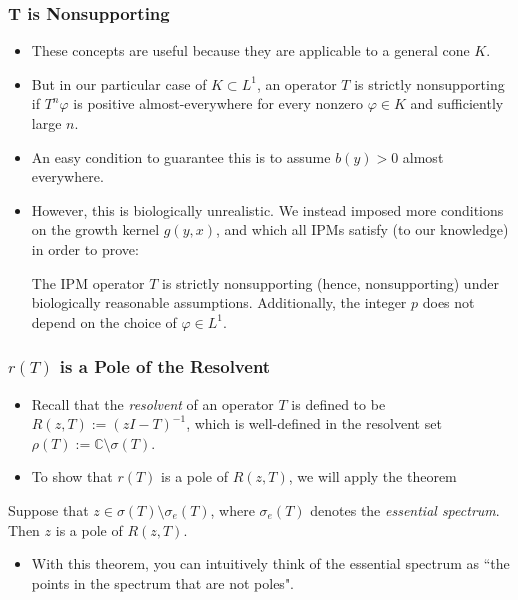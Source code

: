 \documentclass{beamer}
\newcommand{\C}{\mathbb{C}}
\begin{document}
\begin{frame}
	\frametitle{T is Nonsupporting}
	\begin{itemize}
		\item These concepts are useful because they are applicable to a general cone $K$.
		\pause
		\item But in our particular case of $K \subset L^1$, an operator $T$ is strictly nonsupporting if $T^n \varphi$ is positive almost-everywhere for every nonzero $\varphi \in K$ and sufficiently large $n$.
		\pause
		\item An easy condition to guarantee this is to assume $b(y) > 0$ almost everywhere.
		\pause
		\item However, this is biologically unrealistic. We instead imposed more conditions on the growth kernel $g(y, x)$, and which all IPMs satisfy (to our knowledge) in order to prove:
		\pause
		\begin{theorem}
			The IPM operator $T$ is strictly nonsupporting (hence, nonsupporting) under biologically reasonable assumptions. Additionally, the integer $p$ does not depend on the choice of $\varphi \in L^1$.
		\end{theorem}
	\end{itemize}
\end{frame}

\begin{frame}
	\frametitle{$r(T)$ is a Pole of the Resolvent}
	\begin{itemize}
		\item Recall that the \emph{resolvent} of an operator $T$ is defined to be $R(z, T) := (zI - T)^{-1}$, which is well-defined in the resolvent set $\rho(T) := \C \setminus \sigma(T)$.
		\pause
		\item To show that $r(T)$ is a pole of $R(z, T)$, we will apply the theorem
	\end{itemize}
	\pause
	\begin{theorem}
		Suppose that $z \in \sigma(T) \setminus \sigma_e(T)$, where $\sigma_e(T)$ denotes the \emph{essential spectrum}. Then $z$ is a pole of $R(z, T)$.
	\end{theorem}
	\begin{itemize}
		\item With this theorem, you can intuitively think of the essential spectrum as ``the points in the spectrum that are not poles".
	\end{itemize}
\end{frame}
\end{document}
